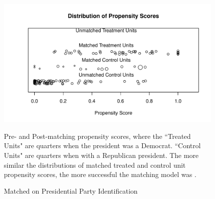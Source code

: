 \documentclass[a4paper]{article}\usepackage{graphicx, color}
\makeatletter
\def\maxwidth{ %
  \ifdim\Gin@nat@width>\linewidth
    \linewidth
  \else
    \Gin@nat@width
  \fi
}
\newenvironment{knitrout}{}{} %
\makeatother
\begin{document}
\begin{figure}[h]
  \caption{Matched on Presidential Party Identification}
  \label{PresPropensityScores}
\begin{knitrout}
\color{fgcolor}

{\centering \includegraphics[width=\maxwidth]{figure/PresPropensity} 

}



\end{knitrout}

  \begin{singlespace}
      {\scriptsize{Pre- and Post-matching propensity scores, where the ``Treated Units" are quarters when the president was a Democrat. ``Control Units" are quarters when with a Republican president. The more similar the distributions of matched treated and control unit propensity scores, the more successful the matching model was \cite[17]{Hollyer2012}.}}
  \end{singlespace}
\end{figure}
\end{document}

